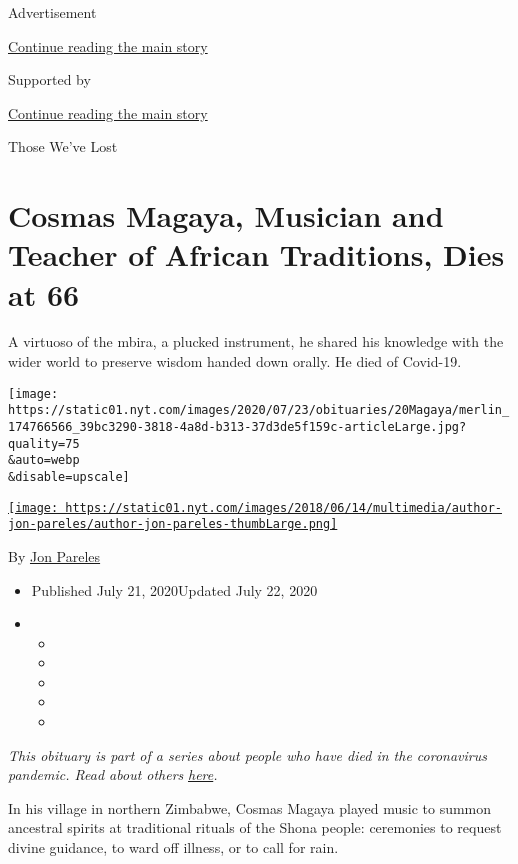 Advertisement

\protect\hyperlink{after-top}{Continue reading the main story}

Supported by

\protect\hyperlink{after-sponsor}{Continue reading the main story}

Those We've Lost

\hypertarget{cosmas-magaya-musician-and-teacher-of-african-traditions-dies-at-66}{%
\section{Cosmas Magaya, Musician and Teacher of African Traditions, Dies
at
66}\label{cosmas-magaya-musician-and-teacher-of-african-traditions-dies-at-66}}

A virtuoso of the mbira, a plucked instrument, he shared his knowledge
with the wider world to preserve wisdom handed down orally. He died of
Covid-19.

\texttt{[image: https://static01.nyt.com/images/2020/07/23/obituaries/20Magaya/merlin\_174766566\_39bc3290-3818-4a8d-b313-37d3de5f159c-articleLarge.jpg?quality=75\\\&auto=webp\\\&disable=upscale]}

\href{https://www.nytimes.com/by/jon-pareles}{\texttt{[image: https://static01.nyt.com/images/2018/06/14/multimedia/author-jon-pareles/author-jon-pareles-thumbLarge.png]}}

By \href{https://www.nytimes.com/by/jon-pareles}{Jon Pareles}

\begin{itemize}
\item
  Published July 21, 2020Updated July 22, 2020
\item
  \begin{itemize}
  \item
  \item
  \item
  \item
  \item
  \end{itemize}
\end{itemize}

\emph{This obituary is part of a series about people who have died in
the coronavirus pandemic. Read about others}
\href{https://www.nytimes.com/interactive/2020/obituaries/people-died-coronavirus-obituaries.html}{\emph{here}}\emph{.}

In his village in northern Zimbabwe, Cosmas Magaya played music to
summon ancestral spirits at traditional rituals of the Shona people:
ceremonies to request divine guidance, to ward off illness, or to call
for rain.

